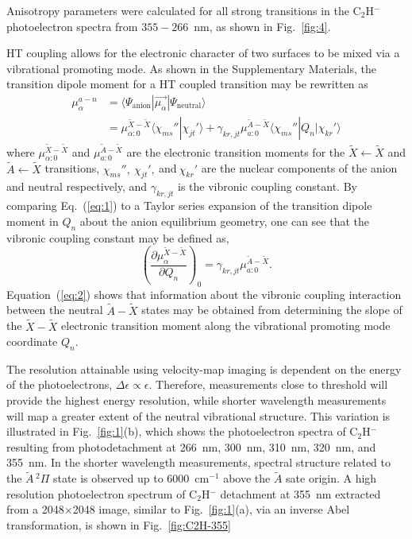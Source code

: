 \documentclass[journal=jpcafh,manuscript=article,layout=onecolumn, 12pt]{achemso}
\begin{document}
Anisotropy parameters were calculated for all strong transitions in the C$_2$H$^-$ photoelectron spectra from $355-266$~nm, as shown in Fig.~\ref{fig:4}. 


HT coupling allows for the electronic character of two surfaces to be mixed via a vibrational promoting mode. As shown in the Supplementary Materials, the transition dipole moment for a HT coupled transition may be rewritten as
\begin{align}
\mu_{\alpha}^{a-n} &= \langle \Psi_{\text{anion}}|\vec{\mu_{\alpha}}|\Psi_{\text{neutral}}\rangle\\
&= \mu_{\alpha:0}^{\tilde{X}-\tilde{X}}\langle\chi_{ms}''|\chi_{jt}'\rangle+\gamma_{kr,jt}\mu_{a:0}^{\tilde{A}-\tilde{X}}\langle\chi_{ms}''|Q_n|\chi_{kr}'\rangle
\label{eq:1}
\end{align}  
where $\mu_{\alpha:0}^{\tilde{X}-\tilde{X}}$ and $\mu_{a:0}^{\tilde{A}-\tilde{X}}$ are the electronic transition moments for the $\tilde{X}\leftarrow\tilde{X}$ and $\tilde{A}\leftarrow\tilde{X}$ transitions, $\chi_{ms}'',~\chi_{jt}',~$and$~\chi_{kr}'$ are the nuclear components of the anion and neutral respectively, and $\gamma_{kr,jt}$ is the vibronic coupling constant. By comparing Eq.~(\ref{eq:1}) to a Taylor series expansion of the transition dipole moment in $Q_n$ about the anion equilibrium geometry, one can see that the vibronic coupling constant may be defined as,
\begin{equation}
\left(\frac{\partial\mu_{\alpha}^{\tilde{X}-\tilde{X}}}{\partial Q_n}\right)_0 = \gamma_{kr,jt}\mu_{a:0}^{\tilde{A}-\tilde{X}}.
\label{eq:2}
\end{equation}
Equation~(\ref{eq:2}) shows that information about the vibronic coupling interaction between the neutral $\tilde{A}-\tilde{X}$ states may be obtained from determining the slope of the $\tilde{X}-\tilde{X}$ electronic transition moment along the vibrational promoting mode coordinate $Q_n$.




The resolution attainable using velocity-map imaging is dependent on the energy of the photoelectrons, $\Delta\epsilon\propto\epsilon$. Therefore, measurements close to threshold will provide the highest energy resolution, while shorter wavelength measurements will map a greater extent of the neutral vibrational structure. This variation is illustrated in Fig.~\ref{fig:1}(b), which shows the photoelectron spectra of C$_2$H$^-$ resulting from photodetachment at 266~nm, 300~nm, 310~nm, 320~nm, and 355~nm. In the shorter wavelength measurements, spectral structure related to the $\tilde{A}\,^2\Pi$ state is observed up to 6000~cm$^{-1}$ above the $\tilde{A}$ sate origin. A high resolution photoelectron spectrum of C$_2$H$^-$ detachment at 355~nm extracted from a 2048$\times$2048 image, similar to Fig.~\ref{fig:1}(a), via an inverse Abel transformation, is shown in Fig.~\ref{fig:C2H-355}
\end{document}
